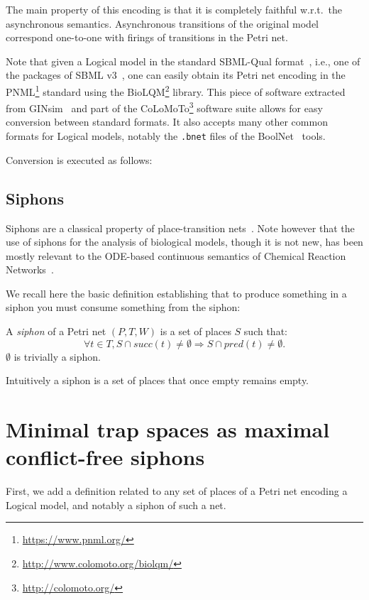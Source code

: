 \documentclass[runningheads]{llncs}
\begin{document}
The main property of this encoding is that it is completely faithful w.r.t.\ the asynchronous semantics.
Asynchronous transitions of the original model correspond one-to-one with firings of transitions in the Petri net.


Note that given a Logical model in the standard SBML-Qual format~\cite{chaouiya2013sbml}, i.e., one of the packages of SBML v3~\cite{keating2020sbml}, one can easily obtain its Petri net encoding in the PNML\footnote{\url{https://www.pnml.org/}} standard using the BioLQM\footnote{\url{http://www.colomoto.org/biolqm/}} library.
This piece of software extracted from GINsim~\cite{chaouiya2012logical} and part of the CoLoMoTo\footnote{\url{http://colomoto.org/}} software suite allows for easy conversion between standard formats.
It also accepts many other common formats for Logical models, notably the \verb|.bnet| files of the  BoolNet~\cite{mussel2010boolnet,klarner2017pyboolnet} tools.

Conversion is executed as follows:


\subsection{Siphons}

Siphons are a classical property of place-transition nets~\cite{peterson1981petri}.
Note however that the use of siphons for the analysis of biological models, though it is not new, has been mostly relevant to the ODE-based continuous semantics of Chemical Reaction Networks~\cite{angeli2007petri,angeli2011persistence,degrand2020graphical}.

We recall here the basic definition establishing that to produce something in a siphon you must consume something from the siphon:

\begin{definition}

  A \emph{siphon} of a Petri net \((P, T, W)\) is a set of places \(S\) such that:
  \[\forall t\in T, S\cap succ(t)\not =\emptyset\Rightarrow S\cap pred(t)\not =\emptyset.\] \(\emptyset\) is trivially a siphon.

\end{definition}

Intuitively a siphon is a set of places that once empty remains empty.

\section{Minimal trap spaces as maximal conflict-free siphons}
First, we add a definition related to any set of places of a Petri net encoding a Logical model, and notably a siphon of such a net.
\end{document}
